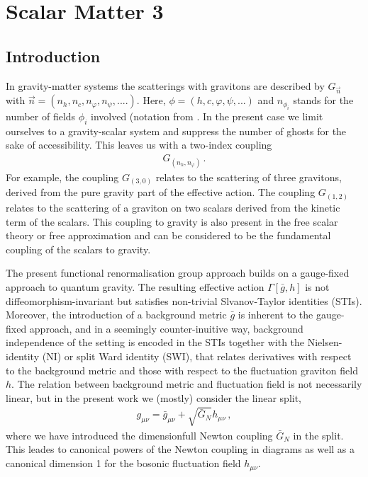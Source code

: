 \documentclass[11pt]{book} %
\numberwithin{equation}{chapter}
\begin{document}

\chapter{Scalar Matter 3}

\section{Introduction}
In gravity-matter systems the scatterings with gravitons are described
by $G_{\vec n}$ with $\vec n=(n_h, n_c,n_\varphi,n_\psi,....)$. Here,
$\phi=(h,c,\varphi,\psi,...)$ and $n_{\phi_i}$ stands for the number
of fields $\phi_i$ involved (notation from \cite{Meibohm:2016mkp} . In
the present case we limit ourselves to a gravity-scalar system and
suppress the number of ghosts for the sake of accessibility. This
leaves us with a two-index coupling
\begin{align}
G_{(n_h,n_\varphi)}\,.
\end{align}
For example, the coupling $G_{(3, 0)}$ relates to the scattering of
three gravitons, derived from the pure gravity part of the effective
action. The coupling $G_{(1,2)}$ relates to the scattering of a
graviton on two scalars derived from the kinetic term of the
scalars. This coupling to gravity is also present in the free scalar
theory or free approximation and can be considered to be the
fundamental coupling of the scalars to gravity.

The present functional renormalisation group approach builds on a
gauge-fixed approach to quantum gravity. The resulting effective
action $\Gamma[\bar g,h]$ is not diffeomorphism-invariant but
satisfies non-trivial Slvanov-Taylor identities (STIs). Moreover, the
introduction of a background metric $\bar g$ is inherent to the
gauge-fixed approach, and in a seemingly counter-inuitive way,
background independence of the setting is encoded in the STIs together
with the Nielsen-identity (NI) or split Ward identity (SWI), that
relates derivatives with respect to the background metric and those
with respect to the fluctuation graviton field $h$. The relation
between background metric and fluctuation field is not necessarily
linear, but in the present work we (mostly) consider the linear split,
\begin{align}\label{eq:linpara}
  g_{\mu \nu}=\bar g_{\mu \nu}+ \sqrt{\bar{G}_N} h_{\mu \nu}\,,
\end{align}
where we have introduced the dimensionfull Newton coupling $\bar{G}_N$ in the split. This
leades to canonical powers of the Newton coupling in diagrams as well
as a canonical dimension 1 for the bosonic fluctuation field $h_{\mu \nu}$.
\end{document}
